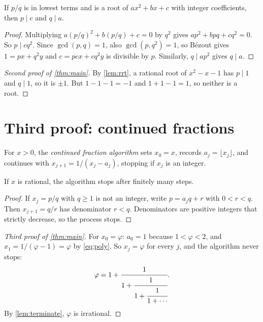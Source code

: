 \documentclass[11pt,a4paper]{article}
\begin{document}
\begin{lemma}\label{lem:rrt}
  If $p/q$ is in lowest terms and is a root of $a x^2 + b x + c$ with integer
  coefficients, then $p \mid c$ and $q \mid a$.
\end{lemma}

\begin{proof}
  Multiplying $a(p/q)^2 + b(p/q) + c = 0$ by $q^2$ gives $ap^2 + bpq + cq^2 = 0$. So
  $p \mid cq^2$. Since $\gcd(p, q) = 1$, also $\gcd(p, q^2) = 1$, so B\'ezout gives
  $1 = px + q^2y$ and $c = pcx + cq^2y$ is divisible by $p$. Similarly, $q \mid ap^2$
  gives $q \mid a$.
\end{proof}

\begin{proof}[Second proof of \cref{thm:main}]
  By \cref{lem:rrt}, a rational root of $x^2 - x - 1$ has $p \mid 1$ and $q \mid 1$, so
  it is $\pm 1$. But $1 - 1 - 1 = -1$ and $1 + 1 - 1 = 1$, so neither is a root.
\end{proof}

\section{Third proof: continued fractions}

For $x > 0$, the \emph{continued fraction algorithm} sets $x_0 = x$, records
$a_j = \lfloor x_j \rfloor$, and continues with $x_{j+1} = 1/(x_j - a_j)$, stopping if
$x_j$ is an integer.

\begin{lemma}\label{lem:terminate}
  If $x$ is rational, the algorithm stops after finitely many steps.
\end{lemma}

\begin{proof}
  If $x_j = p/q$ with $q \geq 1$ is not an integer, write $p = a_j q + r$ with
  $0 < r < q$. Then $x_{j+1} = q/r$ has denominator $r < q$. Denominators are positive
  integers that strictly decrease, so the process stops.
\end{proof}

\begin{proof}[Third proof of \cref{thm:main}]
  For $x_0 = \varphi$: $a_0 = 1$ because $1 < \varphi < 2$, and
  $x_1 = 1/(\varphi - 1) = \varphi$ by \eqref{eq:poly}. So $x_j = \varphi$ for every
  $j$, and the algorithm never stops:
  \[
    \varphi = 1 + \cfrac{1}{1 + \cfrac{1}{1 + \cfrac{1}{1 + \dotsb}}}.
  \]
  By \cref{lem:terminate}, $\varphi$ is irrational.
\end{proof}
\end{document}
